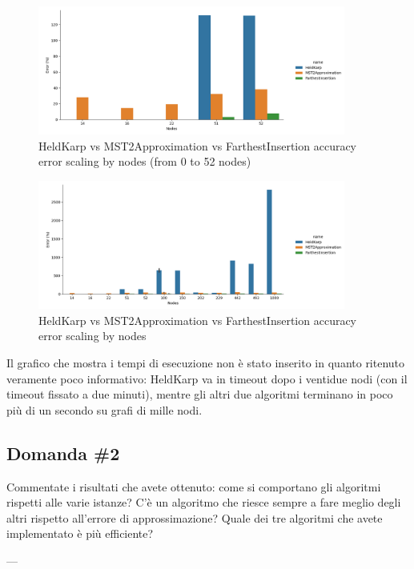 \begin{figure}[H]
    \centering

    \includegraphics[width=0.9\textwidth]{./images/HeldKarp_vs_MST2Approximation_vs_FarthestInsertion__approximation_error__limited_to_52_nodes_.png}

    \caption{HeldKarp vs MST2Approximation vs FarthestInsertion accuracy error scaling by nodes (from 0 to 52 nodes)}
    \label{fig:heldkarp-mst2approx-farthestinsertion-accuracy-error-52-nodes}
\end{figure}

\begin{figure}[H]
    \centering

    \includegraphics[width=0.9\textwidth]{./images/HeldKarp_vs_MST2Approximation_vs_FarthestInsertion__approximation_error_.png}

    \caption{HeldKarp vs MST2Approximation vs FarthestInsertion accuracy error scaling by nodes}
    \label{fig:heldkarp-mst2approx-farthestinsertion-accuracy-error}
\end{figure}

Il grafico che mostra i tempi di esecuzione non è stato inserito
in quanto ritenuto veramente poco informativo: HeldKarp va in 
timeout dopo i ventidue nodi (con il timeout fissato a due minuti),
mentre gli altri due algoritmi terminano in poco più di un secondo
su grafi di mille nodi. 

\subsection{Domanda \#2}

\begin{displayquote}
Commentate i risultati che avete ottenuto: come si comportano gli
algoritmi rispetti alle varie istanze? C'è un algoritmo che riesce
sempre a fare meglio degli altri rispetto all'errore di 
approssimazione? Quale dei tre algoritmi che avete implementato è
più efficiente?
\end{displayquote}


\noindent ---\\
